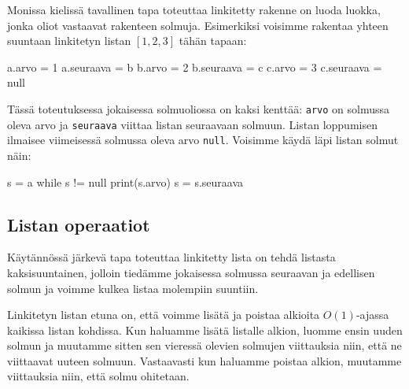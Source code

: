 Monissa kielissä tavallinen tapa toteuttaa linkitetty rakenne
on luoda luokka, jonka oliot vastaavat rakenteen solmuja.
Esimerkiksi voisimme rakentaa yhteen suuntaan
linkitetyn listan $[1,2,3]$ tähän tapaan:

\begin{code}
a.arvo = 1
a.seuraava = b
b.arvo = 2
b.seuraava = c
c.arvo = 3
c.seuraava = null
\end{code}

Tässä toteutuksessa jokaisessa solmuoliossa on kaksi kenttää:
\texttt{arvo} on solmussa oleva arvo ja
\texttt{seuraava} viittaa listan seuraavaan solmuun.
Listan loppumisen ilmaisee viimeisessä solmussa oleva arvo \texttt{null}.
Voisimme käydä läpi listan solmut näin:

\begin{code}
s = a
while s != null
    print(s.arvo)
    s = s.seuraava
\end{code}

\subsection{Listan operaatiot}

Käytännössä järkevä tapa toteuttaa linkitetty lista on tehdä
listasta kaksisuuntainen, jolloin tiedämme jokaisessa solmussa
seuraavan ja edellisen solmun ja voimme kulkea listaa molempiin suuntiin.

Linkitetyn listan etuna on,
että voimme lisätä ja poistaa
alkioita $O(1)$-ajassa kaikissa listan kohdissa.
Kun haluamme lisätä listalle alkion,
luomme ensin uuden solmun ja muutamme sitten
sen vieressä olevien solmujen viittauksia niin,
että ne viittaavat uuteen solmuun.
Vastaavasti kun haluamme poistaa alkion,
muutamme viittauksia niin, että solmu ohitetaan.


